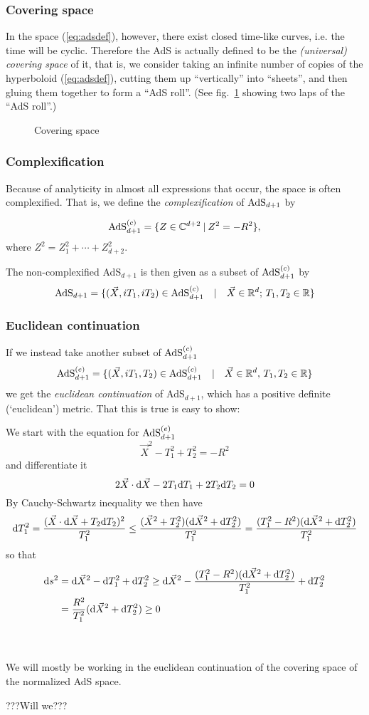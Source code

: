 \subsubsection{Covering space}
In the space (\ref{eq:adsdef}), however, there exist closed time-like curves, i.e. the time will be cyclic. Therefore the AdS is actually defined to be the {\em (universal) covering space} of it, that is, we consider taking an infinite number of copies of the hyperboloid (\ref{eq:adsdef}), cutting them up ``vertically'' into ``sheets'', and then gluing them together to form a ``AdS roll''. 
(See fig.~\ref{fig:cover} showing two laps of the ``AdS roll''.)
\begin{figure}[h]
\begin{center}
\end{center}
\caption{Covering space}\label{fig:cover}
\end{figure}

\subsubsection{Complexification}
Because of analyticity in almost all expressions that occur, the space is often complexified. That is, we define the {\em complexification} of $\mathrm{AdS}_{d+1}$ by

$$\mathrm{AdS}_{d+1}^{(c)}=\{Z\in\mathbb{C}^{d+2}\:|\:Z^2=-R^2\},$$
where $Z^2=Z_1^2+\cdots+Z_{d+2}^2$.

The non-complexified AdS$_{d+1}$ is then given as a subset of $\mathrm{AdS}_{d+1}^{(c)}$ by
$$\mathrm{AdS}_{d+1}=\{(\vec{X},iT_1,iT_2)\in \textrm{AdS}_{d+1}^{(c)}\quad|\quad\vec{X}\in\mathbb{R}^d;\,T_1,T_2\in\mathbb{R}\}$$

\subsubsection{Euclidean continuation}
If we instead take another subset of $\mathrm{AdS}_{d+1}^{(c)}$
$$\mathrm{AdS}_{d+1}^{(e)}=\{(\vec{X},iT_1,T_2)\in\mathrm{AdS}_{d+1}^{(c)}\quad|\quad\vec{X}\in\mathbb{R}^{d},\,T_1,T_2\in\mathbb{R}\}$$
we get the {\em euclidean continuation} of AdS$_{d+1}$, which has a positive definite (`euclidean') metric. That this is true is easy to show:

We start with the equation for $\mathrm{AdS}_{d+1}^{(e)}$
$$\vec{X}^2-T_1^2+T_2^2=-R^2$$
and differentiate it
$$2\vec{X}\cdot \mathrm{d}\vec{X}-2T_1 \mathrm{d} T_1 + 2 T_2 \mathrm{d} T_2=0$$
By Cauchy-Schwartz inequality we then have
$$\mathrm{d} T_1^2 = \frac{(\vec{X}\cdot \mathrm{d}\vec{X}+T_2 \mathrm{d} T_2)^2}{T_1^2}\le\frac{(\vec{X}^2+T_2^2)(\mathrm{d}\vec{X}^2+\mathrm{d} T_2^2)}{T_1^2}=\frac{(T_1^2-R^2)(\mathrm{d}\vec{X}^2+\mathrm{d} T_2^2)}{T_1^2}$$
so that
\begin{equation*}\begin{split}
\mathrm{d} s^2 &= \mathrm{d}\vec{X}^2 - \mathrm{d} T_1^2 + \mathrm{d} T_2^2\ge \mathrm{d}\vec{X}^2-\frac{(T_1^2-R^2)(\mathrm{d}\vec{X}^2 + \mathrm{d} T_2^2)}{T_1^2} + \mathrm{d} T_2^2\\
&=\frac{R^2}{T_1^2}(\mathrm{d}\vec{X}^2+  \mathrm{d} T_2^2)\ge 0
\end{split}\end{equation*}

\\\\
We will mostly be working in the euclidean continuation of the covering space of the normalized AdS space.

???Will we???
